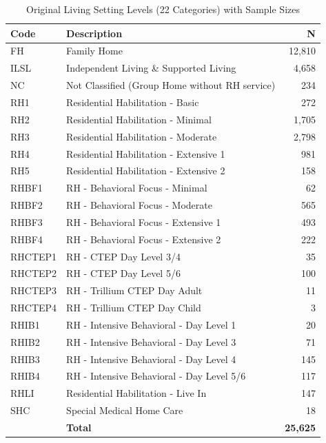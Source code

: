 \begin{table}[htbp]
\centering
\caption{Original Living Setting Levels (22 Categories) with Sample Sizes}
\small
\begin{tabular}{|l|p{7cm}|r|}
\hline
\textbf{Code} & \textbf{Description} & \textbf{N} \\
\hline
FH & Family Home & 12,810 \\
\hline
ILSL & Independent Living \& Supported Living & 4,658 \\
\hline
NC & Not Classified (Group Home without RH service) & 234 \\
\hline
RH1 & Residential Habilitation - Basic & 272 \\
\hline
RH2 & Residential Habilitation - Minimal & 1,705 \\
\hline
RH3 & Residential Habilitation - Moderate & 2,798 \\
\hline
RH4 & Residential Habilitation - Extensive 1 & 981 \\
\hline
RH5 & Residential Habilitation - Extensive 2 & 158 \\
\hline
RHBF1 & RH - Behavioral Focus - Minimal & 62 \\
\hline
RHBF2 & RH - Behavioral Focus - Moderate & 565 \\
\hline
RHBF3 & RH - Behavioral Focus - Extensive 1 & 493 \\
\hline
RHBF4 & RH - Behavioral Focus - Extensive 2 & 222 \\
\hline
RHCTEP1 & RH - CTEP Day Level 3/4 & 35 \\
\hline
RHCTEP2 & RH - CTEP Day Level 5/6 & 100 \\
\hline
RHCTEP3 & RH - Trillium CTEP Day Adult & 11 \\
\hline
RHCTEP4 & RH - Trillium CTEP Day Child & 3 \\
\hline
RHIB1 & RH - Intensive Behavioral - Day Level 1 & 20 \\
\hline
RHIB2 & RH - Intensive Behavioral - Day Level 3 & 71 \\
\hline
RHIB3 & RH - Intensive Behavioral - Day Level 4 & 145 \\
\hline
RHIB4 & RH - Intensive Behavioral - Day Level 5/6 & 117 \\
\hline
RHLI & Residential Habilitation - Live In & 147 \\
\hline
SHC & Special Medical Home Care & 18 \\
\hline
 & \textbf{Total} & \textbf{25,625} \\
\hline
\end{tabular}
\label{tab:original-living-setting}
\end{table}


